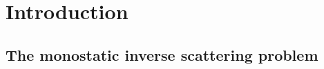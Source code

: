 
\chapter{Introduction}\label{chapter:introduction}

\section{The monostatic inverse scattering problem}